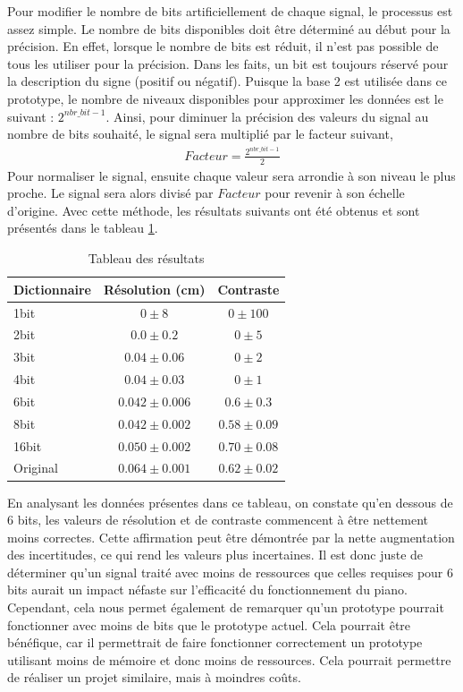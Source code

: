 ﻿\documentclass[11pt,letterpaper]{article}
\begin{document}
Pour modifier le nombre de bits artificiellement de chaque signal, le processus est assez simple.
Le nombre de bits disponibles doit être déterminé au début pour la précision. En effet, lorsque le nombre de bits est réduit,
il n'est pas possible de tous les utiliser pour la précision. Dans les faits, un bit est toujours réservé pour la description du signe (positif ou négatif).
Puisque la base 2 est utilisée dans ce prototype, le nombre de niveaux disponibles pour approximer
les données est le suivant :
$ 2^{nbr\_bit -1}$.
Ainsi, pour diminuer la précision des valeurs du signal au nombre de bits souhaité,
le signal sera multiplié par le facteur suivant, 
\begin{align}
Facteur=\frac{ 2^{nbr\_bit -1}}{2} 
\end{align}
Pour normaliser le signal, ensuite chaque
valeur sera arrondie à son niveau le plus proche. Le signal sera alors divisé par
 $Facteur$ 
 pour revenir à son échelle d'origine. Avec cette méthode, les résultats suivants ont 
 été obtenus et sont présentés dans le tableau \ref{nb_bit_tab}.
\begin{table}[ht]
    \centering
    \begin{tabular}{l c c}
    \hline
    Dictionnaire & Résolution (cm) & Contraste  \\ \hline
    1bit & $0 \pm 8$ & $0 \pm 100$ \\
    2bit & $0.0 \pm 0.2$ & $0 \pm 5$ \\
    3bit & $0.04 \pm 0.06$ & $0 \pm 2$ \\
    4bit & $0.04 \pm 0.03$ & $0 \pm 1$ \\
    6bit & $0.042 \pm 0.006$ & $0.6 \pm 0.3$ \\
    8bit & $0.042 \pm 0.002$ & $0.58 \pm 0.09$ \\
    16bit & $0.050 \pm 0.002$ & $0.70 \pm 0.08$ \\
    Original & $0.064 \pm 0.001$ & $0.62 \pm 0.02$ \\
    \hline
    \end{tabular}
    \caption{Tableau des résultats }
    \label{nb_bit_tab}
  \end{table}
  
  
En analysant les données présentes dans ce tableau, on constate qu'en dessous de 6 bits,  
les valeurs de résolution et de contraste commencent à être nettement moins correctes.  
Cette affirmation peut être démontrée par la nette augmentation des incertitudes, ce qui  
rend les valeurs plus incertaines. Il est donc juste de déterminer qu'un signal traité  
avec moins de ressources que celles requises pour 6 bits aurait un impact néfaste sur  
l'efficacité du fonctionnement du piano. Cependant, cela nous permet également de remarquer  
qu'un prototype pourrait fonctionner avec moins de bits que le prototype actuel.  
Cela pourrait être bénéfique, car il permettrait de faire fonctionner correctement un prototype  
utilisant moins de mémoire et donc moins de ressources. Cela pourrait permettre de réaliser un projet 
similaire, mais à moindres coûts. 
\end{document}
